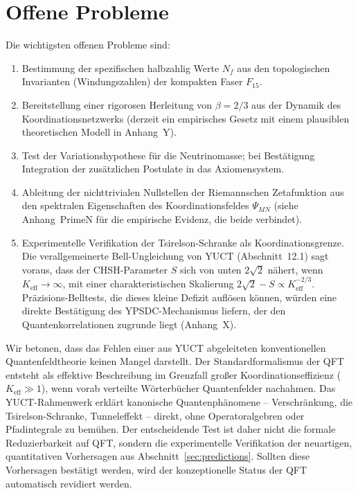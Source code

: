 \documentclass[12pt,a4paper]{article}
\theoremstyle{remark}
\begin{document}
	\section{Offene Probleme}
	\label{sec:open}
	
	Die wichtigsten offenen Probleme sind:
	
	\begin{enumerate}[label=(\roman*)]
		\item Bestimmung der spezifischen halbzahlig Werte \(N_f\) aus den
		topologischen Invarianten (Windungszahlen) der kompakten Faser \(F_{15}\).
		\item Bereitstellung einer rigorosen Herleitung von \(\beta = 2/3\) aus der
		Dynamik des Koordinationsnetzwerks (derzeit ein empirisches Gesetz mit
		einem plausiblen theoretischen Modell in Anhang~Y).
		\item Test der Variationshypothese für die Neutrinomasse; bei Bestätigung
		Integration der zusätzlichen Postulate in das Axiomensystem.
		\item Ableitung der nichttrivialen Nullstellen der Riemannschen Zetafunktion
		aus den spektralen Eigenschaften des Koordinationsfeldes \(\Psi_{MN}\)
		(siehe Anhang~PrimeN für die empirische Evidenz, die beide verbindet).
		\item Experimentelle Verifikation der Tsirelson-Schranke als
		Koordinationsgrenze. Die verallgemeinerte Bell-Ungleichung von YUCT
		(Abschnitt~12.1) sagt voraus, dass der CHSH-Parameter \(S\) sich von unten
		\(2\sqrt{2}\) nähert, wenn \(K_{\mathrm{eff}} \to \infty\), mit einer
		charakteristischen Skalierung \(2\sqrt{2} - S \propto K_{\mathrm{eff}}^{-2/3}\).
		Präzisions-Belltests, die dieses kleine Defizit auflösen können, würden
		eine direkte Bestätigung des YPSDC-Mechanismus liefern, der den
		Quantenkorrelationen zugrunde liegt (Anhang~X).
	\end{enumerate}
	
	Wir betonen, dass das Fehlen einer aus YUCT abgeleiteten konventionellen
	Quantenfeldtheorie keinen Mangel darstellt. Der Standardformalismus der QFT
	entsteht als effektive Beschreibung im Grenzfall großer
	Koordinationseffizienz (\(K_{\mathrm{eff}} \gg 1\)), wenn vorab verteilte
	Wörterbücher Quantenfelder nachahmen. Das YUCT-Rahmenwerk erklärt
	kanonische Quantenphänomene -- Verschränkung, die Tsirelson-Schranke,
	Tunneleffekt -- direkt, ohne Operatoralgebren oder Pfadintegrale zu
	bemühen. Der entscheidende Test ist daher nicht die formale Reduzierbarkeit
	auf QFT, sondern die experimentelle Verifikation der neuartigen,
	quantitativen Vorhersagen aus Abschnitt~\ref{sec:predictions}. Sollten diese
	Vorhersagen bestätigt werden, wird der konzeptionelle Status der QFT
	automatisch revidiert werden.
	
\end{document}
